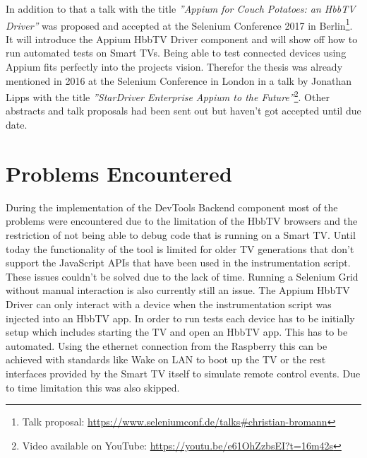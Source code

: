 In addition to that a talk with the title \textit{''Appium for Couch Potatoes: an HbbTV Driver''} was proposed and
accepted at the Selenium Conference 2017 in Berlin\footnote{Talk proposal: \url{https://www.seleniumconf.de/talks\#christian-bromann}}.
It will introduce the Appium HbbTV Driver component and will show off how to run automated tests on Smart TVs. Being
able to test connected devices using Appium fits perfectly into the projects vision. Therefor the thesis was already
mentioned in 2016 at the Selenium Conference in London in a talk by Jonathan Lipps with the title \textit{''StarDriver
Enterprise Appium to the Future''}\footnote{Video available on YouTube: \url{https://youtu.be/e61OhZzbsEI?t=16m42s}}.
Other abstracts and talk proposals had been sent out but haven't got accepted until due date.

\section{Problems Encountered\label{sec:problems}}


During the implementation of the DevTools Backend component most of the problems were encountered due to the limitation
of the HbbTV browsers and the restriction of not being able to debug code that is running on a Smart TV. Until today
the functionality of the tool is limited for older TV generations that don't support the JavaScript APIs that have
been used in the instrumentation script. These issues couldn't be solved due to the lack of time. Running a Selenium
Grid without manual interaction is also currently still an issue. The Appium HbbTV Driver can only interact with a
device when the instrumentation script was injected into an HbbTV app. In order to run tests each device has to be
initially setup which includes starting the TV and open an HbbTV app. This has to be automated. Using the ethernet
connection from the Raspberry this can be achieved with standards like Wake on LAN to boot up the TV or the rest
interfaces provided by the Smart TV itself to simulate remote control events. Due to time limitation this was also
skipped.

